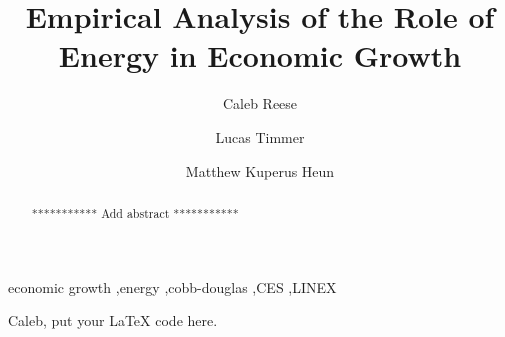 \documentclass[preprint,authoryear,12pt]{elsarticle}\usepackage{graphicx, color}
\begin{document}
\begin{frontmatter}



\title{Empirical Analysis of the Role of Energy in Economic Growth}


\author[Calvin]{Caleb Reese}
\author[Calvin]{Lucas Timmer}
\author[Calvin]{Matthew Kuperus Heun }

\address[Calvin]{Engineering Department, Calvin College, Grand Rapids, MI 49546, USA}

\begin{abstract}
*********** Add abstract ***********
\end{abstract}

\begin{keyword}
economic growth \sep energy \sep cobb-douglas \sep CES \sep LINEX
\end{keyword}

\end{frontmatter}


Caleb, put your LaTeX code here.
\end{document}
